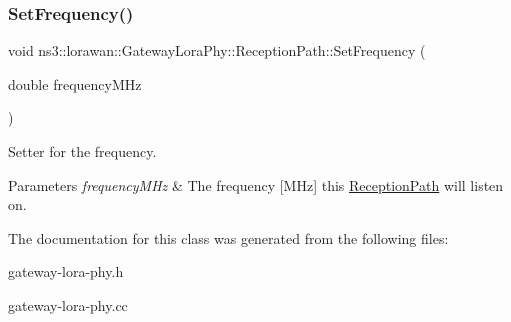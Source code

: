 \subsubsection{\texorpdfstring{Set\+Frequency()}{SetFrequency()}}
{\footnotesize\ttfamily void ns3\+::lorawan\+::\+Gateway\+Lora\+Phy\+::\+Reception\+Path\+::\+Set\+Frequency (\begin{DoxyParamCaption}\item[{double}]{frequency\+M\+Hz }\end{DoxyParamCaption})}

Setter for the frequency.


\begin{DoxyParams}{Parameters}
{\em frequency\+M\+Hz} & The frequency \mbox{[}M\+Hz\mbox{]} this \hyperlink{classns3_1_1lorawan_1_1GatewayLoraPhy_1_1ReceptionPath}{Reception\+Path} will listen on. \\
\hline
\end{DoxyParams}


The documentation for this class was generated from the following files\+:\begin{DoxyCompactItemize}
\item 
gateway-\/lora-\/phy.\+h\item 
gateway-\/lora-\/phy.\+cc\end{DoxyCompactItemize}
